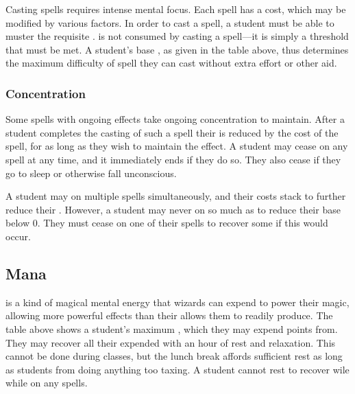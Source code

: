 Casting spells requires intense mental focus.
Each spell has a {\focus} cost, which may be modified by various factors.
In order to cast a spell, a student must be able to muster the requisite {\focus}.
\capital{\focus} is not consumed by casting a spell---it is simply a threshold that must be met.
A student's base {\focus}, as given in the table above, thus determines the maximum difficulty of spell they can cast without extra effort or other aid.

\subsubsection{Concentration}

Some spells with ongoing effects take ongoing concentration to maintain.
After a student completes the casting of such a spell their {\focus} is reduced by the {\concentration} cost of the spell, for as long as they wish to maintain the effect.
A student may cease {\concentrating} on any spell at any time, and it immediately ends if they do so.
They also cease {\concentrating} if they go to sleep or otherwise fall unconscious.

A student may {\concentrate} on multiple spells simultaneously, and their {\concentration} costs stack to further reduce their {\focus}.
However, a student may never {\concentrate} on so much as to reduce their base {\focus} below 0.
They must cease {\concentrating} on one of their spells to recover some {\focus} if this would occur.

\subsection{Mana}

\capital{\mana} is a kind of magical mental energy that wizards can expend to power their magic, allowing more powerful effects than their {\focus} allows them to readily produce.
The table above shows a student's maximum {\mana}, which they may expend points from.
They may recover all their expended {\mana} with an hour of rest and relaxation.
This cannot be done during classes, but the lunch break affords sufficient rest as long as students from doing anything too taxing.
A student cannot rest to recover wile {\mana} while {\concentrating} on any spells.
